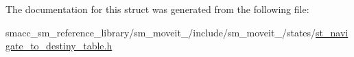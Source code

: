 The documentation for this struct was generated from the following file\+:\begin{DoxyCompactItemize}
\item 
smacc\+\_\+sm\+\_\+reference\+\_\+library/sm\+\_\+moveit\+\_/include/sm\+\_\+moveit\+\_/states/\hyperlink{st__navigate__to__destiny__table_8h}{st\+\_\+navigate\+\_\+to\+\_\+destiny\+\_\+table.\+h}\end{DoxyCompactItemize}
